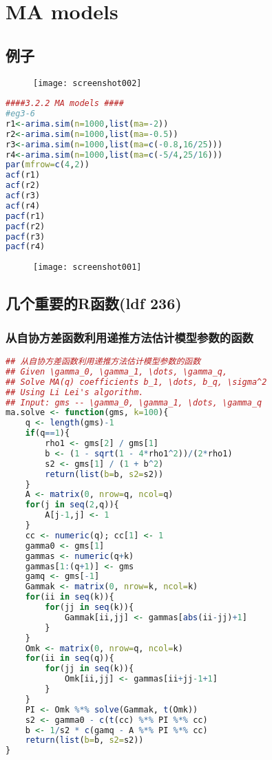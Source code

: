 \documentclass[11pt,a4paper,oneside]{book}
\begin{document}
\chapter{MA models}
\section{例子}
\begin{figure}[H]
	\centering
	\texttt{[image: screenshot002]}
	\label{fig:screenshot002}
\end{figure}
\begin{lstlisting}[language=r]
####3.2.2 MA models ####
#eg3-6
r1<-arima.sim(n=1000,list(ma=-2))
r2<-arima.sim(n=1000,list(ma=-0.5))
r3<-arima.sim(n=1000,list(ma=c(-0.8,16/25)))
r4<-arima.sim(n=1000,list(ma=c(-5/4,25/16)))
par(mfrow=c(4,2))
acf(r1)
acf(r2)
acf(r3)
acf(r4)
pacf(r1)
pacf(r2)
pacf(r3)
pacf(r4)
\end{lstlisting}
\begin{figure}[H]
	\centering
	\texttt{[image: screenshot001]}
	\caption{}
	\label{fig:screenshot001}
\end{figure}
\section{几个重要的R函数(ldf 236)}
\subsection{从自协方差函数利用递推方法估计模型参数的函数}
\begin{lstlisting}[language=r]
## 从自协方差函数利用递推方法估计模型参数的函数
## Given \gamma_0, \gamma_1, \dots, \gamma_q,
## Solve MA(q) coefficients b_1, \dots, b_q, \sigma^2
## Using Li Lei's algorithm.
## Input: gms -- \gamma_0, \gamma_1, \dots, \gamma_q
ma.solve <- function(gms, k=100){
	q <- length(gms)-1
	if(q==1){
		rho1 <- gms[2] / gms[1]
		b <- (1 - sqrt(1 - 4*rho1^2))/(2*rho1)
		s2 <- gms[1] / (1 + b^2)
		return(list(b=b, s2=s2))
	}
	A <- matrix(0, nrow=q, ncol=q)
	for(j in seq(2,q)){
		A[j-1,j] <- 1
	}
	cc <- numeric(q); cc[1] <- 1
	gamma0 <- gms[1]
	gammas <- numeric(q+k)
	gammas[1:(q+1)] <- gms
	gamq <- gms[-1]
	Gammak <- matrix(0, nrow=k, ncol=k)
	for(ii in seq(k)){
		for(jj in seq(k)){
			Gammak[ii,jj] <- gammas[abs(ii-jj)+1]
		}
	}
	Omk <- matrix(0, nrow=q, ncol=k)
	for(ii in seq(q)){
		for(jj in seq(k)){
			Omk[ii,jj] <- gammas[ii+jj-1+1]
		}
	}
	PI <- Omk %*% solve(Gammak, t(Omk))
	s2 <- gamma0 - c(t(cc) %*% PI %*% cc)
	b <- 1/s2 * c(gamq - A %*% PI %*% cc)
	return(list(b=b, s2=s2))
}
\end{lstlisting}
\end{document}
